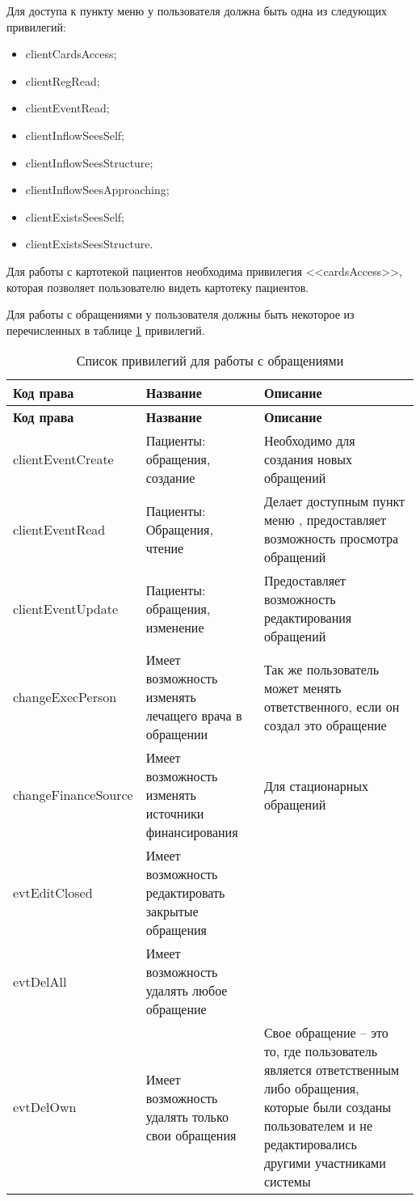 Для доступа к пункту меню  у пользователя должна быть одна из следующих привилегий:
\begin{itemize}
 \item clientCardsAccess;
 \item clientRegRead;
 \item clientEventRead;
 \item clientInflowSeesSelf;
 \item clientInflowSeesStructure;
 \item clientInflowSeesApproaching;
 \item clientExistsSeesSelf;
 \item clientExistsSeesStructure.
\end{itemize}

Для работы с картотекой пациентов необходима привилегия <<cardsAccess>>, которая позволяет пользователю видеть картотеку пациентов.

Для работы с обращениями у пользователя должны быть некоторое из перечисленных в таблице \ref{tbl_acs_priv_obr} привилегий.

{\small
\begin{longtable}{|p{4cm}|p{5cm}|p{7.7cm}|}
\caption{Список привилегий для работы с обращениями \label{tbl_acs_priv_obr}} \\
\hline \rule{0pt}{15pt} \centering \textbf{Код права} & \centering \textbf{Название} & \hfil \textbf{Описание} \\ \hline
\endfirsthead
\hline \rule{0pt}{15pt} \centering \textbf{Код права} & \centering \textbf{Название} & \hfil \textbf{Описание} \\ \hline
\endhead
 clientEventCreate & 	Пациенты: обращения, создание &	Необходимо для создания новых обращений \\ \hline
 clientEventRead &	Пациенты: Обращения, чтение &	Делает доступным пункт меню \mm{Работа \str Обслуживание пациентов}, предоставляет возможность просмотра обращений \\ \hline
 clientEventUpdate &	Пациенты: обращения, изменение & 	Предоставляет возможность редактирования обращений \\ \hline
 changeExecPerson &	Имеет возможность изменять лечащего врача в обращении &	Так же пользователь может менять ответственного, если он создал это обращение \\ \hline
 changeFinanceSource & Имеет возможность изменять источники финансирования &	Для стационарных обращений \\ \hline
 evtEditClosed & Имеет возможность редактировать закрытые обращения &  \\ \hline
 evtDelAll & Имеет возможность удалять любое обращение &  \\ \hline 	
 evtDelOwn &	Имеет возможность удалять только свои обращения &	Свое обращение – это то, где пользователь является ответственным либо обращения, которые были созданы пользователем и не редактировались другими участниками системы \\ \hline
\end{longtable}
}

